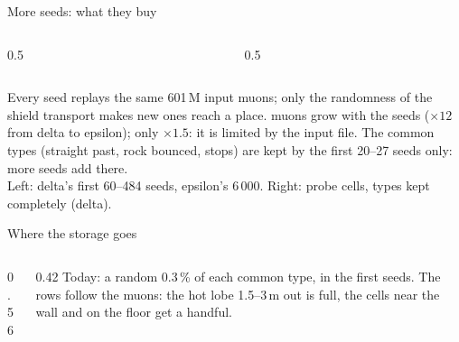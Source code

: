 \documentclass[aspectratio=169,10pt]{beamer}
\newcommand{\legendline}[1]{{\color{muted}\lightfont\scriptsize #1}}
\begin{document}
\begin{frame}{More seeds: what they buy}
  \begin{columns}[c]
    \begin{column}{0.5\textwidth}
    \end{column}
    \begin{column}{0.5\textwidth}
    \end{column}
  \end{columns}
  \vspace{1mm}\footnotesize
  Every seed replays the same 601\,M input muons; only the randomness of the shield transport makes new ones reach a place.
   muons grow with the seeds ($\times12$ from delta to epsilon);  only $\times1.5$: it is limited by the input file.
  The common types (straight past, rock bounced, stops) are kept by the first 20--27 seeds only: more seeds add  there.\\[0.5mm]
  \legendline{Left: delta's first 60--484 seeds, epsilon's 6\,000. Right: probe cells, types kept completely (delta).}
\end{frame}

\begin{frame}{Where the storage goes}
  \\[0.5mm]
  \begin{columns}[c]
    \begin{column}{0.56\textwidth}
      \\[0.3mm]
    \end{column}
    \begin{column}{0.42\textwidth}\footnotesize
      Today: a  random 0.3\,\% of each common type, in the first seeds. The rows follow the muons: the hot lobe 1.5--3\,m out is full, the cells near the wall and on the floor get a handful.
    \end{column}
  \end{columns}
\end{frame}
\end{document}
